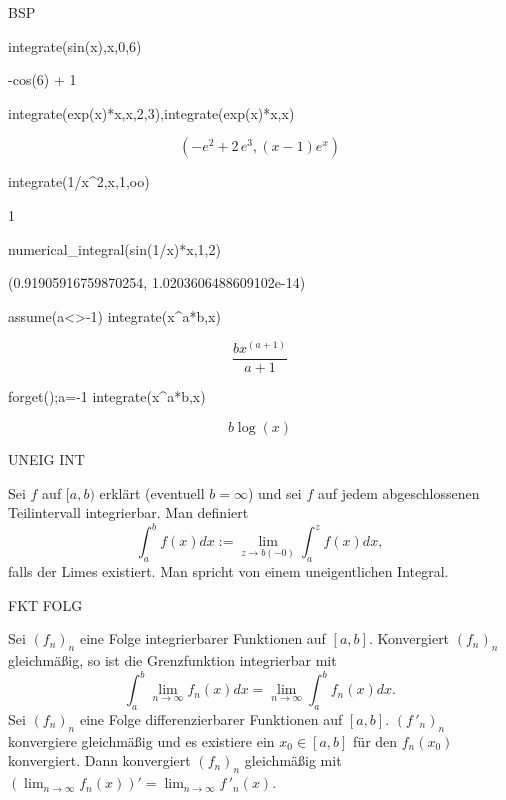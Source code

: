 \documentclass[fontsize=12pt,paper=a4,twoside,bibtotoc,idxtotoc,
liststotoc,pagesize,BCOR1.2cm,DIV15,chapterprefix,pagesize=pdftex]{scrbook}
\theoremstyle{plain}
\theoremstyle{definition}
\theoremstyle{remark}
\begin{document}
BSP

\begin{sagein}
 integrate(sin(x),x,0,6)
\end{sagein}
\begin{sage}
-cos(6) + 1
\end{sage}
\begin{sagein}
integrate(exp(x)*x,x,2,3),integrate(exp(x)*x,x)
\end{sagein}
{\color{blue}\[\left(-e^{2} + 2 \, e^{3}, {\left(x - 1\right)} e^{x}\right)\]}
\begin{sagein}
integrate(1/x^2,x,1,oo)
\end{sagein}
\begin{sage}
  1
\end{sage}
\begin{sagein}
numerical_integral(sin(1/x)*x,1,2)
\end{sagein}
\begin{sage}
  (0.91905916759870254, 1.0203606488609102e-14)
\end{sage}
\begin{sagein}
assume(a<>-1)
integrate(x^a*b,x)
\end{sagein}
{\color{blue} \[ \frac{b x^{{\left(a + 1\right)}}}{a + 1}\]}
\begin{sagein}
forget();a=-1
integrate(x^a*b,x)
\end{sagein}
{\color{blue} \[ b \log\left(x\right)\]}

UNEIG INT

Sei $f$ auf $[a,b)$ erklärt (eventuell $b=\infty$) und sei $f$ auf jedem
abgeschlossenen Teilintervall integrierbar. Man definiert
\[  \int_a^b f(x)dx := \lim_{z \rightarrow b (-0)} \int_a^z f(x)dx,\]
falls der Limes existiert. Man spricht von einem {\color{red}
uneigentlichen Integral}.

FKT FOLG


 Sei $(f_n)_n$ eine Folge integrierbarer Funktionen auf
$[a,b]$. Konvergiert $(f_n)_n$ gleichmäßig, so ist die Grenzfunktion
integrierbar mit
\[ \int_a^b \lim_{n \rightarrow \infty} f_n(x) dx = \lim_{n
\rightarrow \infty} \int_a^b f_n(x) dx .\]
 Sei $(f_n)_n$ eine Folge differenzierbarer Funktionen auf
$[a,b]$. $(f\,'_n)_n$ konvergiere gleichmäßig und es existiere ein $x_0
\in [a,b]$ für den $f_n(x_0)$ konvergiert. Dann konvergiert $(f_n)_n$
gleichmäßig mit $( \lim_{n \rightarrow \infty} f_n(x))' = \lim_{n
\rightarrow \infty} f\,'_n(x)$.  
\end{document}
